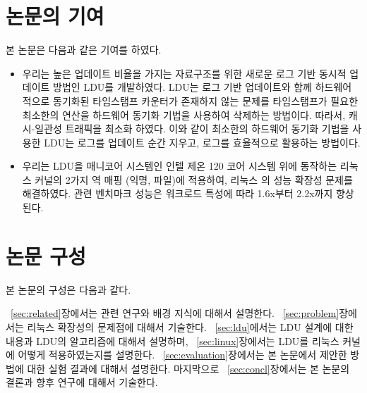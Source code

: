 \newpage
\section{논문의 기여}\label{sec:introcontri}
본 논문은 다음과 같은 기여를 하였다.
\begin{itemize}
\item 우리는 높은 업데이트 비율을 가지는 자료구조를 위한 새로운 로그 기반 동시적 업데이트
 방법인 LDU를 개발하였다.
LDU는 로그 기반 업데이트와 함께 하드웨어 적으로 동기화된 타임스탬프 카운터가 존재하지 않는 문제를 
타임스탬프가 필요한 최소한의 연산을 하드웨어 동기화 기법을 사용하여 삭제하는 방법이다.
따라서, 캐시-일관성 트래픽을 최소화 하였다.
이와 같이 최소한의 하드웨어 동기화 기법을 사용한 LDU는 로그를 업데이트 순간 지우고, 
로그를 효율적으로 활용하는 방법이다.  
\item 
우리는 LDU을 매니코어 시스템인 인텔 제온 120 코어 시스템 위에 동작하는 리눅스 커널의 
2가지 역 매핑 (익명, 파일)에 적용하여, 리눅스 의 성능 확장성 문제를 해결하였다.
 관련 벤치마크 성능은 워크로드 특성에 따라 1.6x부터 2.2x까지 향상된다.
\end{itemize}


\newpage
\section{논문 구성} \label{sec:intro}
본 논문의 구성은 다음과 같다.

~\ref{sec:related}장에서는 관련 연구와 배경 지식에 대해서 설명한다.
~\ref{sec:problem}장에서는 리눅스 확장성의 문제점에 대해서 기술한다. 
~\ref{sec:ldu}에서는 LDU 설계에 대한 내용과 LDU의 알고리즘에 대해서 설명하며,
~\ref{sec:linux}장에서는 LDU를 리눅스 커널에 어떻게 적용하였는지를 설명한다.
~\ref{sec:evaluation}장에서는 본 논문에서 제안한 방법에 대한 실험 결과에 대해서 설명한다. 
마지막으로 ~\ref{sec:concl}장에서는 본 논문의 결론과 향후 연구에 대해서 기술한다. 

